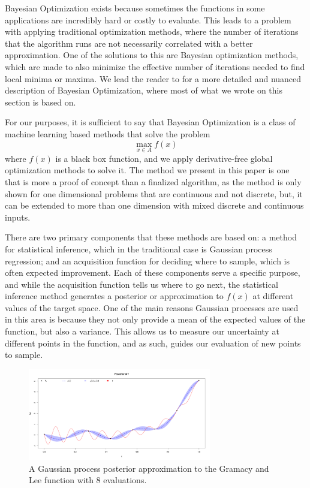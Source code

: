 \documentclass[%
 aip,
 amsmath,amssymb,
 reprint,%
]{revtex4-1}
\begin{document}
Bayesian Optimization exists because sometimes the functions in some applications are incredibly hard or costly to evaluate. This leads to a problem with applying traditional optimization methods, where the number of iterations that the algorithm runs are not necessarily correlated with a better approximation. One of the solutions to this are Bayesian optimization methods, which are made to also minimize the effective number of iterations needed to find local minima or maxima. We lead the reader to  for a more detailed and nuanced description of Bayesian Optimization, where most of what we wrote on this section is based on. 

For our purposes, it is sufficient to say that Bayesian Optimization is a class of machine learning based methods that solve the problem 
\[ \max_{x \in A} f(x) \]
where $f(x)$ is a black box function, and we apply derivative-free global optimization methods to solve it. The method we present in this paper is one that is more a proof of concept than a finalized algorithm, as the method is only shown for one dimensional problems that are continuous and not discrete, but, it can be extended to more than one dimension with mixed discrete and continuous inputs. 

There are two primary components that these methods are based on: a method for statistical inference, which in the traditional case is Gaussian process regression; and an acquisition function for deciding where to sample, which is often expected improvement. Each of these components serve a specific purpose, and while the acquisition function tells us where to go next, the statistical inference method generates a posterior or approximation to $f(x)$ at different values of the target space. One of the main reasons Gaussian processes are used in this area is because they not only provide a mean of the expected values of the function, but also a variance. This allows us to measure our uncertainty at different points in the function, and as such, guides our evaluation of new points to sample. 

\begin{figure}
	\centering
	\includegraphics[width=8cm]{Figures/GP8.png}
	\caption{A Gaussian process posterior approximation to the Gramacy and Lee function \cite{gramacy2012cases} with 8 evaluations.}
	\label{gp1}
\end{figure}
\end{document}
